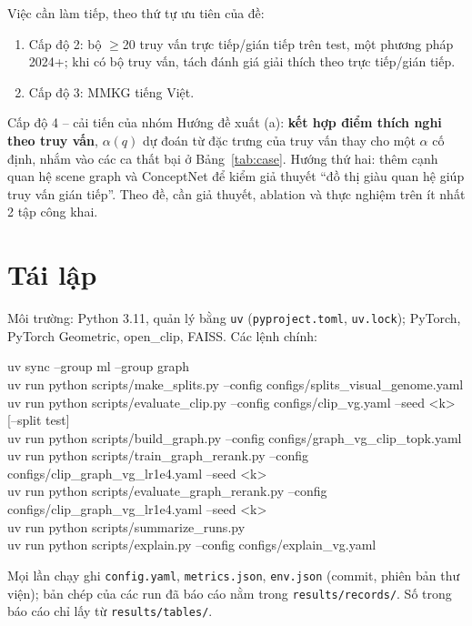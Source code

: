 \documentclass[12pt, a4paper]{article}
\newenvironment{ghichu}[1][Ghi chú]{%
  \begin{tcolorbox}[madridblock, colback=madrid!6, colframe=madrid, title={#1}]
}{\end{tcolorbox}}
\newcommand{\code}[1]{\texttt{#1}}
\begin{document}
Việc cần làm tiếp, theo thứ tự ưu tiên của đề:
\begin{enumerate}
\item Cấp độ 2: bộ $\ge$20 truy vấn trực tiếp/gián tiếp trên test, một phương pháp 2024+; khi có bộ truy vấn, tách đánh giá giải thích theo trực tiếp/gián tiếp.
\item Cấp độ 3: MMKG tiếng Việt.
\end{enumerate}

\begin{chualam}{Cấp độ 4 -- cải tiến của nhóm}
Hướng đề xuất (a): \textbf{kết hợp điểm thích nghi theo truy vấn}, $\alpha(q)$ dự đoán từ đặc trưng của truy vấn thay cho một $\alpha$ cố định, nhắm vào các ca thất bại ở Bảng~\ref{tab:case}. Hướng thứ hai: thêm cạnh quan hệ scene graph và ConceptNet để kiểm giả thuyết ``đồ thị giàu quan hệ giúp truy vấn gián tiếp''. Theo đề, cần giả thuyết, ablation và thực nghiệm trên ít nhất 2 tập công khai.
\end{chualam}

\appendix
\section{Tái lập}
Môi trường: Python 3.11, quản lý bằng \code{uv} (\code{pyproject.toml}, \code{uv.lock}); PyTorch, PyTorch Geometric, open\_clip, FAISS. Các lệnh chính:
\begin{ghichu}[Lệnh chạy lại]\ttfamily\footnotesize\raggedright
uv sync --group ml --group graph\\
uv run python scripts/make\_splits.py --config configs/splits\_visual\_genome.yaml\\
uv run python scripts/evaluate\_clip.py --config configs/clip\_vg.yaml --seed <k> [--split test]\\
uv run python scripts/build\_graph.py --config configs/graph\_vg\_clip\_topk.yaml\\
uv run python scripts/train\_graph\_rerank.py --config configs/clip\_graph\_vg\_lr1e4.yaml --seed <k>\\
uv run python scripts/evaluate\_graph\_rerank.py --config configs/clip\_graph\_vg\_lr1e4.yaml --seed <k>\\
uv run python scripts/summarize\_runs.py\\
uv run python scripts/explain.py --config configs/explain\_vg.yaml
\end{ghichu}
Mọi lần chạy ghi \code{config.yaml}, \code{metrics.json}, \code{env.json} (commit, phiên bản thư viện); bản chép của các run đã báo cáo nằm trong \code{results/records/}. Số trong báo cáo chỉ lấy từ \code{results/tables/}.
\end{document}
